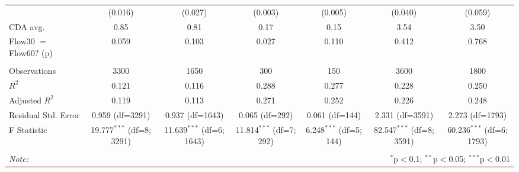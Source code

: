 \begin{table}[!htbp]
\begin{tabular}{@{\extracolsep{5pt}}lcccccc}
& (0.016) & (0.027) & (0.003) & (0.005) & (0.040) & (0.059) \\
 CDA avg. & 0.85 & 0.81 & 0.17 & 0.15 & 3.54 & 3.50 \\
 Flow30 $=$ Flow60? (p) & 0.059 & 0.103 & 0.027 & 0.110 & 0.412 & 0.768 \\
\hline \\[-1.8ex]
 Observations & 3300 & 1650 & 300 & 150 & 3600 & 1800 \\
 $R^2$ & 0.121 & 0.116 & 0.288 & 0.277 & 0.228 & 0.250 \\
 Adjusted $R^2$ & 0.119 & 0.113 & 0.271 & 0.252 & 0.226 & 0.248 \\
 Residual Std. Error & 0.959 (df=3291) & 0.937 (df=1643) & 0.065 (df=292) & 0.061 (df=144) & 2.331 (df=3591) & 2.273 (df=1793) \\
 F Statistic & 19.777$^{***}$ (df=8; 3291) & 11.639$^{***}$ (df=6; 1643) & 11.814$^{***}$ (df=7; 292) & 6.248$^{***}$ (df=5; 144) & 82.547$^{***}$ (df=8; 3591) & 60.236$^{***}$ (df=6; 1793) \\
\hline
\hline \\[-1.8ex]
\textit{Note:} & \multicolumn{6}{r}{$^{*}$p$<$0.1; $^{**}$p$<$0.05; $^{***}$p$<$0.01} \\
\end{tabular}
\end{table}